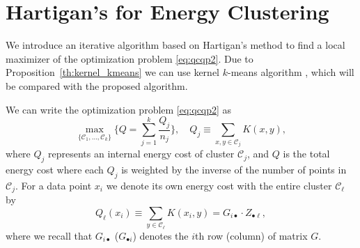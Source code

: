 \documentclass[twoside]{article}
\newcommand\kk{K}
\newcommand\C{{\mathcal{C}}}
\begin{document}
\section{Hartigan's for Energy Clustering}
\label{sec:algo}

We introduce an iterative algorithm based
on Hartigan's method \citep{Hartigan} to find a local
maximizer of the optimization problem \eqref{eq:qcqp2}. Due to 
Proposition~\ref{th:kernel_kmeans} we can use 
kernel $k$-means algorithm \citep{Dhillon2,Dhillon}, which
will be compared with the proposed algorithm. 

We can write the optimization problem \eqref{eq:qcqp2} as
\begin{equation}
\label{eq:maxQ}
\max_{\{ \C_1,\dotsc,\C_k \}} 
\bigg\{ Q = \sum_{j=1}^k \dfrac{Q_j}{n_j}  \bigg\},
\quad Q_j \equiv \sum_{x,y\in\C_j} \kk(x,y),
\end{equation}
where $Q_j$ represents an internal energy cost of cluster $\C_j$, and
$Q$ is the total energy cost where each $Q_j$ 
is weighted by the inverse
of the number of points in $\C_j$. For a data point $x_i$ we denote
its own energy cost
with the entire cluster $\C_\ell$ by
\begin{equation}
\label{eq:costxij}
Q_\ell(x_i) \equiv \sum_{y\in\C_\ell} \kk(x_i, y) = 
G_{i \bullet} \cdot Z_{\bullet \ell},
\end{equation}
where we recall that $G_{i\bullet}$ ($G_{\bullet i}$) denotes
the $i$th row (column) of matrix $G$.
\end{document}
